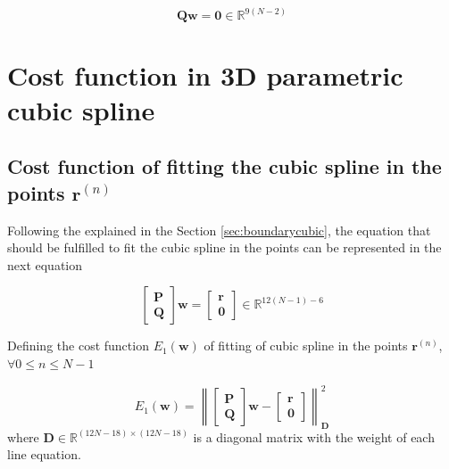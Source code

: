 \begin{equation}
\mathbf{Q}
\mathbf{w}
=\mathbf{0}\in \mathbb{R}^{9(N-2)}
\end{equation}




\section{Cost function in 3D parametric cubic spline}

\subsection{Cost function of fitting the cubic spline in the points $\mathbf{r}^{(n)}$}

Following the explained in the Section \ref{sec:boundarycubic},
the equation that should be fulfilled to fit the cubic spline in the points can be represented in the next equation

\begin{equation}
\begin{bmatrix}
\mathbf{P}\\
\mathbf{Q}
\end{bmatrix}
\mathbf{w}
=
\begin{bmatrix}
\mathbf{r}\\
\mathbf{0}
\end{bmatrix}
\in \mathbb{R}^{12(N-1)-6}
\end{equation}

Defining the cost function $E_{1}(\mathbf{w})$ of fitting of cubic spline in the points $\mathbf{r}^{(n)}$,
$\forall 0\leq n\leq N-1$

\begin{equation}\label{eq:costfunc1}
E_{1}(\mathbf{w})
=
\left\|
\begin{bmatrix}
\mathbf{P}\\
\mathbf{Q}
\end{bmatrix}
\mathbf{w}
-
\begin{bmatrix}
\mathbf{r}\\
\mathbf{0}
\end{bmatrix}
\right\|_{\mathbf{D}}^{2}
\end{equation}
where $\mathbf{D}\in \mathbb{R}^{(12N-18)\times(12N-18)}$ is a diagonal matrix with the weight of each line equation.


